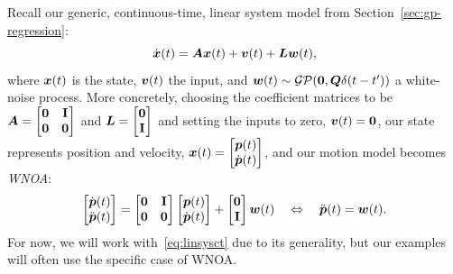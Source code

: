 Recall our generic, continuous-time, linear system model from Section~\ref{sec:gp-regression}:
\begin{equation}\label{eq:linsysct}
\dot{{\boldsymbol{x}}}(t) = {\boldsymbol{A}} {\boldsymbol{x}}(t) + {\boldsymbol{v}}(t) + {\boldsymbol{L}} {\boldsymbol{w}}(t),
\end{equation}
where ${\boldsymbol{x}}(t)$ is the state, ${\boldsymbol{v}}(t)$ the input, and ${\boldsymbol{w}}(t) \sim \mathcal{GP}(\mathbf{0}, {\boldsymbol{Q}} \delta(t-t^\prime))$ a white-noise process.  More concretely, choosing the coefficient matrices to be ${\boldsymbol{A}} = \begin{bmatrix} \mathbf{0} & \mathbf{I} \\ \mathbf{0} & \mathbf{0} \end{bmatrix}$ and ${\boldsymbol{L}} = \begin{bmatrix} \mathbf{0} \\ \mathbf{I} \end{bmatrix}$ and setting the inputs to zero, ${\boldsymbol{v}}(t) = \mathbf{0}$, our state represents position and velocity, ${\boldsymbol{x}}(t) = \begin{bmatrix} {\boldsymbol{p}}(t) \\ \dot{{\boldsymbol{p}}}(t) \end{bmatrix}$, and our motion model becomes {\em \ac{WNOA}}:
\begin{equation}
\begin{bmatrix} \dot{{\boldsymbol{p}}}(t) \\ \ddot{{\boldsymbol{p}}}(t) \end{bmatrix} = \begin{bmatrix} \mathbf{0} & \mathbf{I} \\ \mathbf{0} & \mathbf{0} \end{bmatrix} \begin{bmatrix} {\boldsymbol{p}}(t) \\ \dot{{\boldsymbol{p}}}(t) \end{bmatrix} + \begin{bmatrix} \mathbf{0} \\ \mathbf{I} \end{bmatrix} {\boldsymbol{w}}(t) \quad \Leftrightarrow \quad \ddot{{\boldsymbol{p}}}(t) = {\boldsymbol{w}}(t).
\end{equation}
For now, we will work with~\eqref{eq:linsysct} due to its generality, but our examples will often use the specific case of \ac{WNOA}.

